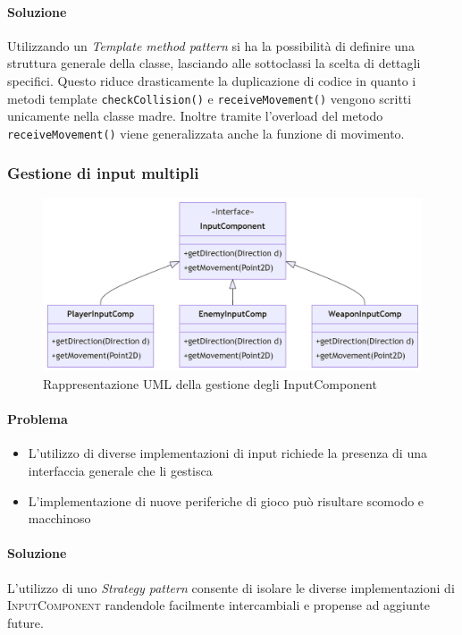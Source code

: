 \documentclass[a4paper,12pt]{report}
\begin{document}
\paragraph{Soluzione}
    Utilizzando un \textit{Template method pattern} si ha la possibilità di definire una struttura generale della classe, lasciando alle sottoclassi la scelta di dettagli specifici. Questo riduce drasticamente la duplicazione di codice in quanto i metodi template \texttt{checkCollision()} e \texttt{receiveMovement()} vengono scritti unicamente nella classe madre. Inoltre tramite l'overload del metodo \texttt{receiveMovement()} viene generalizzata anche la funzione di movimento.
    
\subsubsection{Gestione di input multipli}

\begin{figure}[H]
\centering{}
\includegraphics[width=\textwidth,keepaspectratio]{img/InputComponentUML.png}
\caption{Rappresentazione UML della gestione degli InputComponent}
\end{figure}

\paragraph{Problema}
\begin{itemize}
    \item L'utilizzo di diverse implementazioni di input richiede la presenza di una interfaccia generale che li gestisca
    \item L'implementazione di nuove periferiche di gioco può risultare scomodo e macchinoso
\end{itemize}
\paragraph{Soluzione}
L'utilizzo di uno \textit{Strategy pattern} consente di isolare le diverse implementazioni di \textsc{InputComponent} randendole facilmente intercambiali e propense ad aggiunte future.
    
\end{document}
